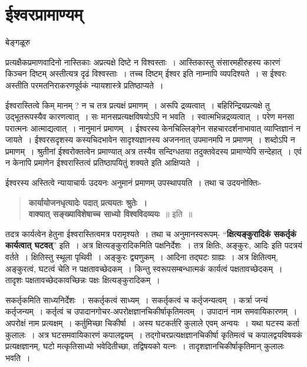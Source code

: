 {\fontsize{15}{17}\selectfont
\chapter{ईश्वरप्रामाण्यम्}

\begin{center}
\smallskip
बेङ्गळूरु
\addrule
\end{center}
प्रत्यक्षैकप्रमाणवादिनो नास्तिकाः अप्रत्यक्षे दिष्टे न विश्वस्ताः~। आस्तिकास्तु संसारमहीरुहस्य कारणं किञ्चन दिष्टम् अस्तीत्यत्र दृढं विश्वस्ताः~। तच्च दिष्टम् ईश्वर इति नाम्नापि व्यपदिश्यते~। स ईश्वरः अस्तीति परमतनिराकरणपूर्वकं न्यायशास्त्रे प्रतिष्ठाप्यते~। 

ईश्वरास्तित्वे किम् मानम् ? न च तत्र प्रत्यक्षं प्रमाणम्~। अरूपि द्रव्यत्वात्~। बहिरिन्द्रियप्रत्यक्षे तु उद्भूतरूपस्यैव कारणत्वात्~। सः मानसप्रत्यक्षविषयोऽपि न भवति~। स्वात्मभिन्नद्रव्यत्वात्~। परेण मनसा परात्मनः आत्माद्यत्वात्~। नानुमानं प्रमाणम्~। ईश्वरस्य केनचिल्लिङ्गेन सहचारदर्शनाभावात् व्याप्तिज्ञानं न जायते~। ईश्वरसदृशस्य कस्यचिदभावेन सादृश्यज्ञानस्य अजननात् उपमानमपि न प्रमाणम्~। शब्दोऽपि न प्रमाणम्~। श्रुतीनां ईश्वरोक्तत्वेन प्रमाण्यात् अत्र तस्यैव सन्दिग्धतया तदुक्तवेदस्य प्रामाण्येपि सन्देहात्~। एवं न केनापि प्रमाणेन ईश्वरास्तित्वं प्रतिष्ठापयितुं शक्यते इति आक्षिप्यते~। 

ईश्वरस्य अस्तित्वे न्यायाचार्यः उदयनः अनुमानं प्रमाणम् उपस्थापयति~। तथा च उदयनोक्तिः-
\begin{verse}
\textbf{कार्यायोजनधृत्यादेः पदात् प्रत्ययतः श्रुतेः~। \\
वाक्यात् सङ्ख्याविशेषाच्च साध्यो विश्वविदव्ययः}~॥ इति~॥
\end{verse}
तदत्र कार्यत्वेन हेतुना ईश्वरास्तित्वमत्र परामृश्यते~। तथा च अनुमानस्वरूपम्- “\textbf{क्षित्यङ्कुरादिकं सकर्तृकं कार्यत्वात् घटवत्}” इति~। अत्र क्षित्यङ्कुरादिकमिति पक्षनिर्देशः~। तत्र क्षितिः, अङ्कुरः, आदिः इति पदत्रयं वर्तते~। क्षितिस्तु स्थूला पृथिवी~। अङ्कुरः द्व्यणुकम्~। आदिना तद्घटः ग्राह्यः~। अत्र क्षितित्वम्, अङ्कुरत्वं, घटत्वं चेति न पक्षतावच्छेदकम्~। किन्तु स्वरूपसम्बन्धात्मकं कार्यत्वं पक्षतावच्छेदकम्~। तादृशः पक्षतावच्छेदकावच्छिन्नः पक्षः क्षित्यङ्कुरादिकम्~। 

सकर्तृकमिति साध्यनिर्देशः~। सकर्तृकत्वं साध्यम्~। सकर्तृकत्वं च कर्तृजन्यत्वम्~। कर्त्रा जन्यं कर्तृजन्यम्~। कर्तृत्वं च उपादानगोचर-अपरोक्षज्ञानचिकीर्षाकृतिमत्वम्~। उपादानं नाम समवायिकारणम्~। अपरोक्षं नाम प्रत्यक्षम्~। कर्तुमिच्छा चिकीर्षा~। अस्य घटकर्तरि कुलाले एवम् अन्वयः~। यथा घटस्य कर्ता कुलालः~। अत्र घटसमवायिकारणं कपालद्वयम्~। तद्गोचरप्रत्यक्षज्ञानचिकीर्षा कृतिमत्वं च कपालद्वयविषयकं प्रत्यक्षज्ञानम्, घटो मत्कृतिसाध्यो भवेदितीच्छा, तद्विषयको यत्नः~। तादृशज्ञानचिकीर्षाकृतिमान् कुलालः भवति~। 

}
